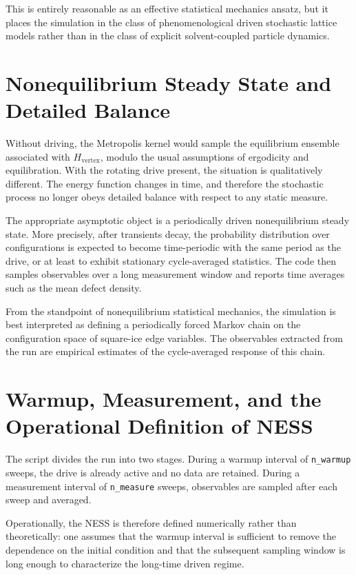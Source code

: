 \documentclass[11pt]{article}
\begin{document}
This is entirely reasonable as an effective statistical mechanics ansatz, but it
places the simulation in the class of phenomenological driven stochastic lattice
models rather than in the class of explicit solvent-coupled particle dynamics.

\section{Nonequilibrium Steady State and Detailed Balance}

Without driving, the Metropolis kernel would sample the equilibrium ensemble
associated with $H_{\mathrm{vertex}}$, modulo the usual assumptions of
ergodicity and equilibration. With the rotating drive present, the situation is
qualitatively different. The energy function changes in time, and therefore the
stochastic process no longer obeys detailed balance with respect to any static
measure.

The appropriate asymptotic object is a periodically driven nonequilibrium steady
state. More precisely, after transients decay, the probability distribution over
configurations is expected to become time-periodic with the same period as the
drive, or at least to exhibit stationary cycle-averaged statistics. The code
then samples observables over a long measurement window and reports time
averages such as the mean defect density.

From the standpoint of nonequilibrium statistical mechanics, the simulation is
best interpreted as defining a periodically forced Markov chain on the
configuration space of square-ice edge variables. The observables extracted from
the run are empirical estimates of the cycle-averaged response of this chain.

\section{Warmup, Measurement, and the Operational Definition of NESS}

The script divides the run into two stages. During a warmup interval of
\texttt{n\_warmup} sweeps, the drive is already active and no data are retained.
During a measurement interval of \texttt{n\_measure} sweeps, observables are
sampled after each sweep and averaged.

Operationally, the NESS is therefore defined numerically rather than
theoretically: one assumes that the warmup interval is sufficient to remove the
dependence on the initial condition and that the subsequent sampling window is
long enough to characterize the long-time driven regime.
\end{document}

